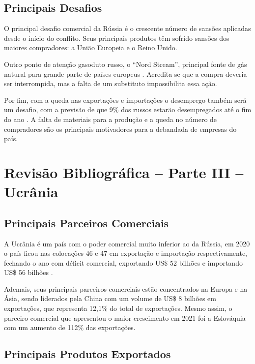 \documentclass[12pt]{article}
\begin{document}
\subsection{Principais Desafios}

O principal desafio comercial da Rússia é o crescente número de sansões aplicadas desde o início do conflito. Seus principais produtos têm sofrido sansões dos maiores compradores: a União Europeia e o Reino Unido. 

Outro ponto de atenção gasoduto russo, o “Nord Stream”, principal fonte de gás natural para grande parte de países europeus \cite{sanctionsRussiaBBC22}. Acredita-se que a compra deveria ser interrompida, mas a falta de um substituto impossibilita essa ação. 

Por fim, com a queda nas exportações e importações o desemprego também será um desafio, com a previsão de que 9\% dos russos estarão desempregados até o fim do ano \cite{russiaUnemployment22}. A falta de materiais para a produção e a queda no número de compradores são os principais motivadores para a debandada de empresas do país.

\pagebreak

\section{Revisão Bibliográfica – Parte III – Ucrânia}

\subsection{Principais Parceiros Comerciais}

A Ucrânia é um país com o poder comercial muito inferior ao da Rússia, em 2020 o país ficou nas colocações 46 e 47 em exportação e importação respectivamente, fechando o ano com déficit comercial, exportando US\$ 52 bilhões e importando US\$ 56 bilhões \cite{oecUkraine22}. 

Ademais, seus principais parceiros comerciais estão concentrados na Europa e na Ásia, sendo liderados pela China com um volume de US\$ 8 bilhões em exportações, que representa 12,1\% do total de exportações. Mesmo assim, o parceiro comercial que apresentou o maior crescimento em 2021 foi a Eslováquia com um aumento de 112\% das exportações.

\subsection{Principais Produtos Exportados}
\end{document}
